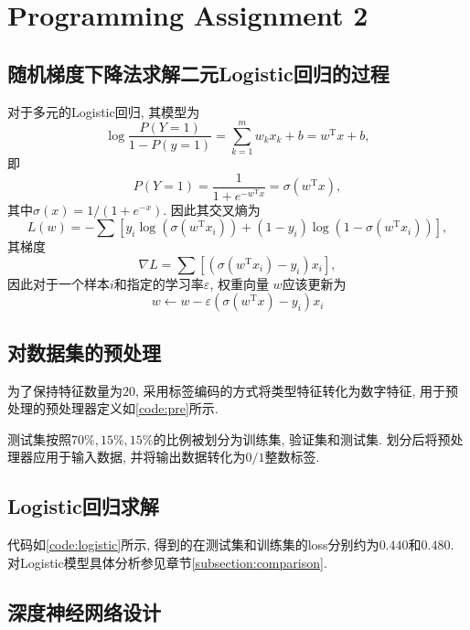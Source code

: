 \section{Programming Assignment 2}

\subsection{随机梯度下降法求解二元Logistic回归的过程}

\noindent 对于多元的Logistic回归, 其模型为$$\log \frac{P(Y=1)}{1-P(y=1)}=\sum_{k=1}^{m}w_kx_k+b=w^\mathrm{T}x+b,$$即
$$P(Y=1)=\frac{1}{1+e^{-w^\mathrm{T}x}}=\sigma(w^{\mathrm{T}}x),$$其中$\sigma(x)=1/(1+e^{-x})$. 因此其交叉熵为
$$L(w)=-\sum\left[y_i \log(\sigma(w^\mathrm{T}x_i))+(1-y_i)\log(1-\sigma(w^\mathrm{T}x_i))\right],$$其梯度
$$\nabla L=\sum\left[(\sigma(w^\mathrm{T}x_i)-y_i)x_i\right],$$ 因此对于一个样本$i$和指定的学习率$\varepsilon$, 权重向量
$w$应该更新为$$w\leftarrow w-\varepsilon (\sigma(w^\mathrm{T}x)-y_i)x_i$$

\subsection{对数据集的预处理}

为了保持特征数量为$20$, 采用标签编码的方式将类型特征转化为数字特征, 用于预处理的预处理器定义如\ref{code:pre}所示.



测试集按照$70\%,15\%,15\%$的比例被划分为训练集, 验证集和测试集. 划分后将预处理器应用于输入数据, 并将输出数据转化为$0/1$整数标签.

\subsection{Logistic回归求解}

代码如\ref{code:logistic}所示, 得到的在测试集和训练集的loss分别约为$0.440$和$0.480$. 对Logistic模型具体分析参见章节\ref{subsection:comparison}.



\subsection{深度神经网络设计}

